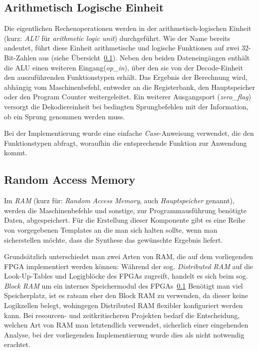\subsection{Arithmetisch Logische Einheit}

Die eigentlichen Rechenoperationen werden in der arithmetisch-logischen Einheit (kurz: \textit{ALU} für \textit{arithmetic logic unit}) durchgeführt.
Wie der Name bereits andeutet, führt diese Einheit arithmetische und logische Funktionen auf zwei 32-Bit-Zahlen aus (siehe Übersicht~\ref{}).
Neben den beiden Dateneingängen enthält die ALU einen weiteren Eingang(\textit{op\_in}), über den sie von der Decode-Einheit den auszuführenden Funktionstypen erhält.
Das Ergebnis der Berechnung wird, abhängig vom Maschinenbefehl, entweder an die Registerbank, den Hauptspeicher oder den Program Counter weitergeleitet.
Ein weiterer Ausgangsport (\textit{zero\_flag}) versorgt die Dekodiereinheit bei bedingten Sprungbefehlen mit der Information, ob ein Sprung genommen werden muss. 

Bei der Implementierung wurde eine einfache \textit{Case}-Anweisung verwendet, die den Funktionstypen abfragt, woraufhin die entsprechende Funktion zur Anwendung kommt.

\subsection{Random Access Memory}
\label{subsec:RAM}

Im \textit{RAM} (kurz für: \textit{Random Access Memory}, auch \textit{Hauptspeicher} genannt), werden die Maschinenbefehle und sonstige, zur Programmausführung benötigte Daten, abgespeichert.
Für die Erstellung dieser Komponente gibt es eine Reihe von vorgegebenen Templates an die man sich halten sollte, wenn man sicherstellen möchte, dass die Synthese das gewünschte Ergebnis liefert.~\cite[S. 243 ff.]{Chu}

Grundsätzlich unterschiedet man zwei Arten von RAM, die auf dem vorliegenden FPGA implementiert werden können:
Während der sog. \textit{Distributed RAM} auf die Look-Up-Tables und Logigblöcke des FPGAs zugreift, handelt es sich beim sog. \textit{Block RAM} um ein internes Speichermodul des FPGAs~\ref{}
Benötigt man viel Speicherplatz, ist es ratsam eher den Block RAM zu verwenden, da dieser keine Logikzellen belegt, wohingegen Distributed RAM flexibler konfiguriert werden kann.
Bei resourcen- und zeitkritischeren Projekten bedarf die Entscheidung, welchen Art von RAM man letztendlich verwendet, sicherlich einer eingehenden Analyse, bei der vorliegenden Implementierung wurde dies als nicht notwendig erachtet.



